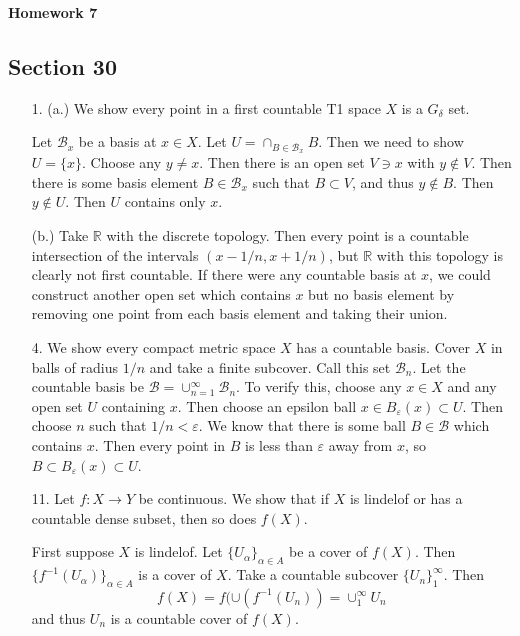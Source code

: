 \documentclass[11pt, reqno]{article}
\theoremstyle{plain}
\theoremstyle{definition}
\theoremstyle{remark}
\renewcommand{\epsilon}{\varepsilon}
\newcommand{\RR}{\mathbb{R}}
\begin{document}
\topmargin=-40pt
\renewcommand{\headrulewidth}{1pt}
\renewcommand{\headsep}{20pt}
\thispagestyle{fancy}

{\Huge \bfseries \noindent Homework 7}

\subsection*{Section 30}

\begin{enumerate}
    \item[1.] (a.) We show every point in a first countable T1 space $X$ is a $G_\delta$ set. 
    
    Let $\mathcal{B}_x$ be a basis at $x \in X$. Let $U = \cap_{B \in \mathcal{B}_x} B$. Then we need to show $U = \{x\}$. 
    Choose any $y \neq x$. Then there is an open set $V \ni x$ with $y \notin V$. Then 
    there is some basis element $B \in \mathcal{B}_x$ such that $B \subset V$, and thus $y \notin B$. 
    Then $y \notin U$. Then $U$ contains only $x$.

    (b.) Take $\RR$ with the discrete topology. Then every point is a countable intersection of 
    the intervals $(x-1/n, x+1/n)$, but $\RR$ with this topology is clearly not first countable.
    If there were any countable basis at $x$, we could construct another open set which 
    contains $x$ but no basis element by removing one point from each basis element and taking their 
    union. 

    \item[4.] We show every compact metric space $X$ has a countable basis. Cover 
    $X$ in balls of radius $1/n$ and take a finite subcover. Call this set $\mathcal{B}_n$. 
    Let the countable basis be $\mathcal{B} = \cup_{n = 1}^\infty \mathcal{B}_n$. To verify this,
    choose any $x \in X$ and any open set $U$ containing $x$. Then choose an epsilon 
    ball $x \in B_\epsilon(x) \subset U$. Then choose $n$ such that $1/n < \epsilon$. We know
    that there is some ball $B \in \mathcal{B}$ which contains $x$. Then every point in $B$
    is less than $\epsilon$ away from $x$, so $B \subset B_\epsilon(x) \subset U$.

    \item[11.] Let $f: X \rightarrow Y$ be continuous. We show that if $X$ is lindelof or has a countable
    dense subset, then so does $f(X)$. 
    
    First suppose $X$ is lindelof. Let $\{U_\alpha\}_{\alpha \in A}$ be a cover of $f(X)$. 
    Then $\{f^{-1}(U_\alpha)\}_{\alpha \in A}$ is a cover of $X$. Take a countable 
    subcover $\{U_n\}_1^\infty$. Then 
    \[
        f(X) = f(\cup(f^{-1}(U_n)) = \cup_1^\infty U_n
    \]
    and thus $U_n$ is a countable cover of $f(X)$.
\end{enumerate}
\end{document}

